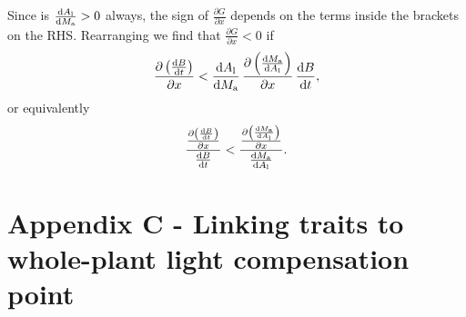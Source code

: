 \documentclass[a4paper,11pt]{article}
\begin{document}
Since is $\frac{{\rm d}A_{\rm l}} {{\rm d}M_{\rm a}}>0$ always, the sign
of $\frac{\partial G} {\partial x}$ depends on the terms inside the brackets on the
RHS. Rearranging we find that $\frac
{\partial G} {\partial x} < 0$ if
\begin{equation}\label{eq:dg3}
\frac{\partial \left( \frac{ {\rm d}B} {{\rm d}t}\right)}{\partial x}
< \frac{{\rm d}A_{\rm l}} {{\rm d}M_{\rm a}}
\,  \frac{\partial \left(\frac{{\rm d}M_{\rm a}} {{\rm d}A_{\rm l}}\right)
}{\partial x} \, \frac{ {\rm d}B} {{\rm d}t},
\end{equation}
or equivalently
\begin{equation}\label{eq:dg4_orig}
\frac{
\frac{\partial \left( \frac{ {\rm d}B} {{\rm d}t}\right)}{\partial x} }
{\frac{ {\rm d}B} {{\rm d}t}}
<
\frac{ \frac{\partial \left(\frac{{\rm d}M_{\rm a}} {{\rm d}A_{\rm l}}\right)
}{\partial x}}{\frac{{\rm d}M_{\rm a}} {{\rm d}A_{\rm l}}}.
\end{equation}

\section{Appendix C - Linking traits to whole-plant light compensation point} \label{app:traits-RGR}


\footnotesize


\end{document}
